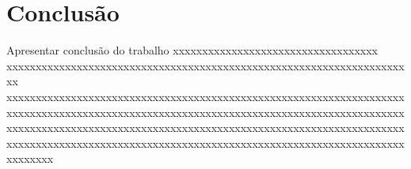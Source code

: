 \chapter{Conclusão}

Apresentar conclusão do trabalho xxxxxxxxxx\-xxxxxxxxxx\-xxxxxxxxxx\-xxxxx xxxxxxxxxx\-xxxxxxxxxx\-xxxxxxxxxx\-xxxxxxxxxx\-xxxxxxxxxx\-xxxxxxxxxx\-xxxxxxxxxx xxxxxxxxxx\-xxxxxxxxxx\-xxxxxxxxxx\-xxxxxxxxxx\-xxxxxxxxxx\-xxxxxxxxxx\-xxxxxxxxxx\-xxxxxxxxxx\-xxxxxxxxxx\-xxxxxxxxxx\-xxxxxxxxxx\-xxxxxxxxxx\-xxxxxxxxxx\-xxxxxxxxxx\-xxxxxxxxxx\-xxxxxxxxxx\-xxxxxxxxxx\-xxxxxxxxxx\-xxxxxxxxxx\-xxxxxxxxxx\-xxxxxxxxxx\-xxxxxxxxxx\-xxxxxxxxxx\-xxxxxxxxxx\-xxxxxxxxxx\-xxxxxxxxxx\-xxxxxxxxxx\-xxxxxxxxxx
